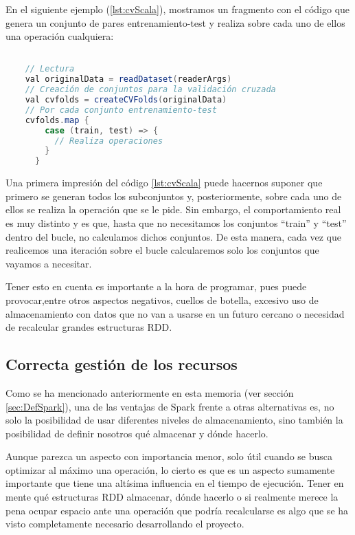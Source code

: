 En el siguiente ejemplo (\ref{lst:cvScala}), mostramos un fragmento con el código que genera un conjunto de pares entrenamiento-test y realiza sobre cada uno de ellos una operación cualquiera:

\begin{lstlisting}[language=Java,tabsize=4,frame = single,caption=Código de ejecución de una validación cruzada en Scala,captionpos=b,label=lst:cvScala,]

	// Lectura
	val originalData = readDataset(readerArgs)
	// Creación de conjuntos para la validación cruzada
    val cvfolds = createCVFolds(originalData)
    // Por cada conjunto entrenamiento-test
    cvfolds.map {
        case (train, test) => {
          // Realiza operaciones
        }
      }
\end{lstlisting}

Una primera impresión del código \ref{lst:cvScala} puede hacernos suponer que primero se generan todos los subconjuntos y, posteriormente, sobre cada uno de ellos se realiza la operación que se le pide. Sin embargo, el comportamiento real es muy distinto y es que, hasta que no necesitamos los conjuntos ``train'' y ``test'' dentro del bucle, no calculamos dichos conjuntos. De esta manera, cada vez que realicemos una iteración sobre el bucle calcularemos solo los conjuntos que vayamos a necesitar.

Tener esto en cuenta es importante a la hora de programar, pues puede provocar,entre otros aspectos negativos, cuellos de botella, excesivo uso de almacenamiento con datos que no van a usarse en un futuro cercano o necesidad de recalcular grandes estructuras RDD.

\subsection{Correcta gestión de los recursos}

Como se ha mencionado anteriormente en esta memoria (ver sección \ref{sec:DefSpark}), una de las ventajas de Spark frente a otras alternativas es, no solo la posibilidad de usar diferentes niveles de almacenamiento, sino también la posibilidad de definir nosotros qué almacenar y dónde hacerlo.

Aunque parezca un aspecto con importancia menor, solo útil cuando se busca optimizar al máximo una operación, lo cierto es que es un aspecto sumamente importante que tiene una altísima influencia en el tiempo de ejecución. Tener en mente qué estructuras RDD almacenar, dónde hacerlo o si realmente merece la pena ocupar espacio ante una operación que podría recalcularse es algo que se ha visto completamente necesario desarrollando el proyecto.

